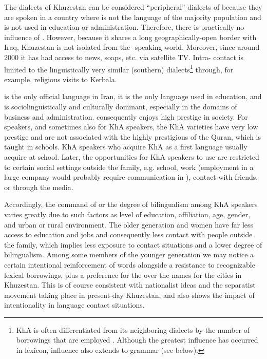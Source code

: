 \documentclass[output=paper,nonflat]{langsci/langscibook}
\begin{document}
The dialects of Khuzestan can be considered “peripheral” dialects of  because they are spoken in a country where  is not the language of the majority population and is not used in education or administration. Therefore, there is practically no influence of  . However, because it shares a long geographically-open border with Iraq, Khuzestan is not isolated from the -speaking world. Moreover, since around 2000 it has had access to  news, soaps, etc. via satellite TV. Intra- contact is limited to the linguistically very similar (southern)  dialects\footnote{KhA is often differentiated from its neighboring  dialects by the number of  borrowings that are employed \citep[1020]{Gazsi2011}. Although the greatest influence has occurred in lexicon,  influence also extends to grammar (see below).} through, for example, religious visits to Kerbala.

 is the only official language in Iran, it is the only language used in education, and is sociolinguistically and culturally dominant, especially in the domains of business and administration.  consequently enjoys high {prestige} in society. For  speakers, and sometimes also for KhA speakers, the KhA varieties have very low {prestige} and are not associated with the highly {prestigious}  of the {Quran}, which is taught in schools. KhA speakers who acquire KhA as a first language usually acquire  at school. Later, the opportunities for KhA speakers to use  are restricted to certain social settings outside the family, e.g. school, work (employment in a large company would probably require communication in ), contact with  friends, or through the  media.

Accordingly, the command of  or the degree of {bilingualism} among KhA speakers varies greatly due to such factors as level of education, affiliation, age, {gender}, and urban or rural environment. The older generation and women have far less access to education and jobs and consequently less contact with people outside the family, which implies less exposure to contact situations and a lower degree of {bilingualism}. Among some members of the younger generation we may notice a certain intentional reinforcement of  words alongside a resistance to recognizable  lexical borrowings, plus a preference for the  over the  names for the cities in Khuzestan. This is of course consistent with nationalist ideas and the separatist movement taking place in present-day Khuzestan, and also shows the impact of intentionality in language contact situations. 
\end{document}
